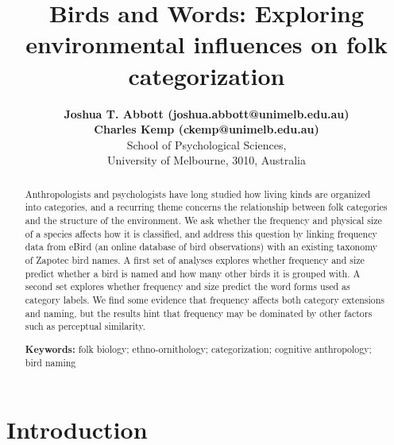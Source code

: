 \documentclass[10pt,letterpaper]{article}
\title{Birds and Words: Exploring environmental influences on folk categorization}
\author{{\large \bf Joshua T. Abbott (joshua.abbott@unimelb.edu.au)} \\
 {\large \bf Charles Kemp (ckemp@unimelb.edu.au)} \\
  School of Psychological Sciences,  \\
  University of Melbourne, 3010, Australia}
\begin{document}
\maketitle


\begin{abstract}

Anthropologists and psychologists have long studied how living kinds are organized into categories, and a recurring theme concerns the relationship between folk categories and the structure of the environment.  We ask whether the frequency and physical size of a species affects how it is classified, and address this question by linking frequency data from eBird (an online database of bird observations) with an existing taxonomy of Zapotec bird names.  A first set of analyses explores whether frequency and size predict whether a bird is named and how many other birds it is grouped with. A second set explores whether frequency and size predict the word forms used as category labels.  We find some evidence that frequency affects both category extensions and naming, but the results hint that frequency may be dominated by other factors such as perceptual similarity.  


\textbf{Keywords:} 
folk biology; ethno-ornithology; categorization; cognitive anthropology; bird naming
\end{abstract}


\section{Introduction}
\end{document}

